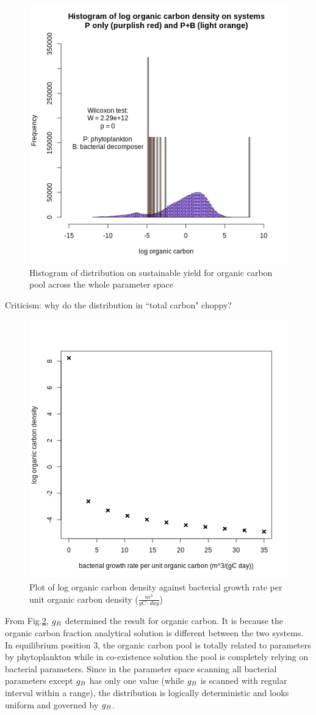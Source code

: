 \documentclass[../thesis.tex]{subfiles} %
\begin{document}
\begin{figure}[H]
    \centering
    \includegraphics[width=.7\linewidth]{report/media/hist_PvsPB_C.png}
    \caption{Histogram of distribution on sustainable yield for organic carbon pool across the whole parameter space}
    \label{hist:C}
\end{figure}

Criticism: why do the distribution in ``total carbon" choppy?

\begin{figure}[H]
    \centering
    \includegraphics[width=.5\linewidth]{report/media/gBEffectOnOrgC.png}
    \caption{Plot of log organic carbon density against bacterial growth rate per unit organic carbon density ($\frac{m^3}{gC\cdot day}$)}
    \label{fig:orgCVSgB}
\end{figure}

From Fig.\ref{fig:orgCVSgB}, $g_B$ determined the result for organic carbon.  It is because the organic carbon fraction analytical solution is different between the two systems.  In equilibrium position 3, the organic carbon pool is totally related to parameters by phytoplankton while in co-existence solution the pool is completely relying on bacterial parameters.  Since in the parameter space scanning all bacterial parameters except $g_B$ has only one value (while $g_B$ is scanned with regular interval within a range), the distribution is logically deterministic and looks uniform and governed by $g_B$.
\end{document}
